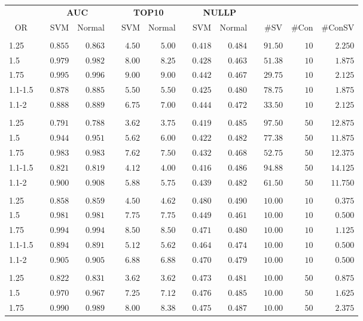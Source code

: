 \documentclass{article}\usepackage[]{graphicx}\usepackage[]{color}
\begin{document}
\begin{table}[H]
\begin{center}
\begin{tabular}{lcrrcrrcrrcrrr}
\hline\hline
\multicolumn{1}{c}{\bfseries }&\multicolumn{1}{c}{\bfseries }&\multicolumn{2}{c}{\bfseries AUC}&\multicolumn{1}{c}{\bfseries }&\multicolumn{2}{c}{\bfseries TOP10}&\multicolumn{1}{c}{\bfseries }&\multicolumn{2}{c}{\bfseries NULLP}&\multicolumn{1}{c}{\bfseries }&\multicolumn{3}{c}{\bfseries }\tabularnewline
\cline{1-14}
\multicolumn{1}{c}{OR}&\multicolumn{1}{c}{}&\multicolumn{1}{c}{SVM}&\multicolumn{1}{c}{Normal}&\multicolumn{1}{c}{}&\multicolumn{1}{c}{SVM}&\multicolumn{1}{c}{Normal}&\multicolumn{1}{c}{}&\multicolumn{1}{c}{SVM}&\multicolumn{1}{c}{Normal}&\multicolumn{1}{c}{}&\multicolumn{1}{c}{\#SV}&\multicolumn{1}{c}{\#Con}&\multicolumn{1}{c}{\#ConSV}\tabularnewline
\hline
&&&&&&&&&&&&&\tabularnewline
1.25&&$0.855$&$0.863$&&$4.50$&$5.00$&&$0.418$&$0.484$&&$91.50$&$10$&$ 2.250$\tabularnewline
1.5&&$0.979$&$0.982$&&$8.00$&$8.25$&&$0.428$&$0.463$&&$51.38$&$10$&$ 1.875$\tabularnewline
1.75&&$0.995$&$0.996$&&$9.00$&$9.00$&&$0.442$&$0.467$&&$29.75$&$10$&$ 2.125$\tabularnewline
1.1-1.5&&$0.878$&$0.885$&&$5.50$&$5.50$&&$0.425$&$0.480$&&$78.75$&$10$&$ 1.875$\tabularnewline
1.1-2&&$0.888$&$0.889$&&$6.75$&$7.00$&&$0.444$&$0.472$&&$33.50$&$10$&$ 2.125$\tabularnewline
\hline
&&&&&&&&&&&&&\tabularnewline
1.25&&$0.791$&$0.788$&&$3.62$&$3.75$&&$0.419$&$0.485$&&$97.50$&$50$&$12.875$\tabularnewline
1.5&&$0.944$&$0.951$&&$5.62$&$6.00$&&$0.422$&$0.482$&&$77.38$&$50$&$11.875$\tabularnewline
1.75&&$0.983$&$0.983$&&$7.62$&$7.50$&&$0.432$&$0.468$&&$52.75$&$50$&$12.375$\tabularnewline
1.1-1.5&&$0.821$&$0.819$&&$4.12$&$4.00$&&$0.416$&$0.486$&&$94.88$&$50$&$14.125$\tabularnewline
1.1-2&&$0.900$&$0.908$&&$5.88$&$5.75$&&$0.439$&$0.482$&&$61.50$&$50$&$11.750$\tabularnewline
\hline
&&&&&&&&&&&&&\tabularnewline
1.25&&$0.858$&$0.859$&&$4.50$&$4.62$&&$0.480$&$0.490$&&$10.00$&$10$&$ 0.375$\tabularnewline
1.5&&$0.981$&$0.981$&&$7.75$&$7.75$&&$0.449$&$0.461$&&$10.00$&$10$&$ 0.500$\tabularnewline
1.75&&$0.994$&$0.994$&&$8.50$&$8.50$&&$0.471$&$0.480$&&$10.00$&$10$&$ 1.125$\tabularnewline
1.1-1.5&&$0.894$&$0.891$&&$5.12$&$5.62$&&$0.464$&$0.474$&&$10.00$&$10$&$ 0.500$\tabularnewline
1.1-2&&$0.905$&$0.905$&&$6.88$&$6.88$&&$0.470$&$0.479$&&$10.00$&$10$&$ 0.500$\tabularnewline
\hline
&&&&&&&&&&&&&\tabularnewline
1.25&&$0.822$&$0.831$&&$3.62$&$3.62$&&$0.473$&$0.481$&&$10.00$&$50$&$ 0.875$\tabularnewline
1.5&&$0.970$&$0.967$&&$7.25$&$7.12$&&$0.476$&$0.485$&&$10.00$&$50$&$ 1.625$\tabularnewline
1.75&&$0.990$&$0.989$&&$8.00$&$8.38$&&$0.475$&$0.487$&&$10.00$&$50$&$ 2.375$\tabularnewline

\end{tabular}
\end{center}
\end{table}
\end{document}
